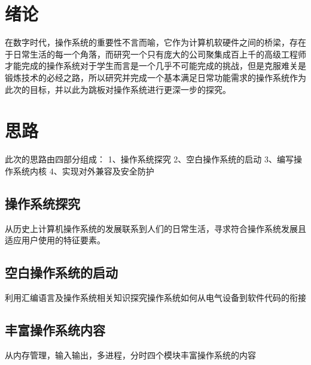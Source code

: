 \documentclass{swfcthesis}
\begin{document}

\makepreliminarypages%
\frontmatter          
\tableofcontents     %
\listoffigures       %
\listoftables        %
\mainmatter

\chapter{绪论}
在数字时代，操作系统的重要性不言而喻，它作为计算机软硬件之间的桥梁，存在于日常生活的每一个角落，而研究一个只有庞大的公司聚集成百上千的高级工程师才能完成的操作系统对于学生而言是一个几乎不可能完成的挑战，但是克服难关是锻炼技术的必经之路\cite{30_os}，所以研究并完成一个基本满足日常功能需求的操作系统作为此次的目标，并以此为跳板对操作系统进行更深一步的探究。
\chapter{思路}
	此次的思路由四部分组成：
	1、操作系统探究
	2、空白操作系统的启动
	3、编写操作系统内核
	4、实现对外兼容及安全防护
	
	\section{操作系统探究}
	从历史上计算机操作系统的发展联系到人们的日常生活，寻求符合操作系统发展且适应用户使用的特征要素。
	
	\section{空白操作系统的启动}
	利用汇编语言及操作系统相关知识探究操作系统如何从电气设备到软件代码的衔接
	
	\section{丰富操作系统内容}
	从内存管理，输入输出，多进程，分时四个模块丰富操作系统的内容
	
\end{document}
